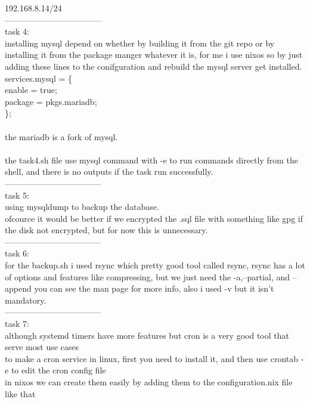 \documentclass[a4paper,14pt]{extarticle}
\begin{document}
192.168.8.14/24\\
-----------------------------------\\
\newpage
task 4:\\
installing mysql depend on whether by building it from the git repo or by installing it from the package manger whatever it is, for me i use nixos so by just adding these lines to the conifguration and rebuild the mysql server get installed.\\
services.mysql = \{\\
  enable = true;\\
  package = pkgs.mariadb;\\
\};\\
\\
the mariadb is a fork of mysql.\\
\\
the task4.sh file use mysql command with -e to run commands directly from the shell, and there is no outputs if the task run successfully.\\
-----------------------------------\\
task 5:\\
using mysqldump to backup the database.\\ofcource it would be better if we encrypted the .sql file with something like gpg if the disk not encrypted, but for now this is unnecessary.\\
-----------------------------------\\
task 6:\\
for the backup.sh i used rsync which pretty good tool called rsync, rsync has a lot of options and features like compressing, but we just need the -a,--partial, and --append you can see the man page for more info, also i used -v but it isn't mandatory.\\
-----------------------------------\\
task 7:\\
although systemd timers have more features but cron is a very good tool that serve most use cases\\
to make a cron service in linux, first you need to install it, and then use crontab -e to edit the cron config file\\
in nixos we can create them easily by adding them to the configuration.nix file like that \\
\end{document}
